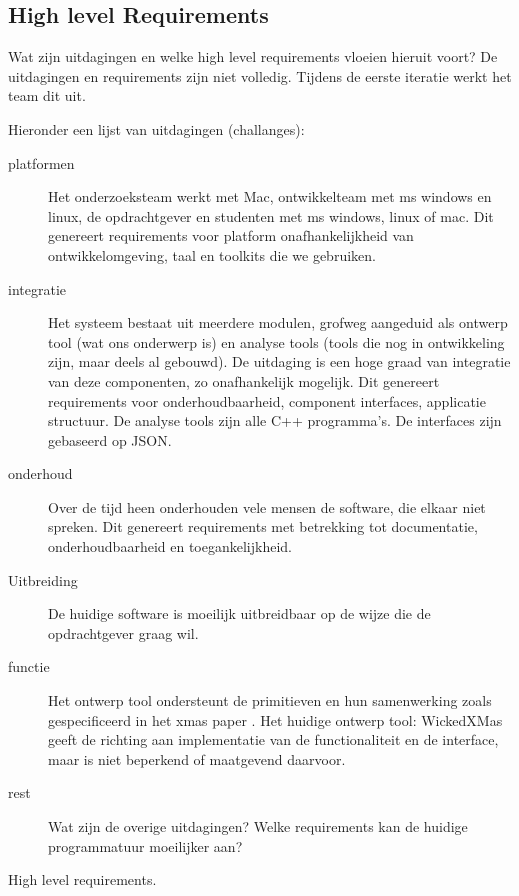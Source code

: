 \subsection{High level Requirements}

Wat zijn uitdagingen en welke high level requirements vloeien hieruit voort? De uitdagingen en requirements
zijn niet volledig. Tijdens de eerste iteratie werkt het team dit uit.

Hieronder een lijst van uitdagingen (challanges):

\begin{description}
 \item[platformen] Het onderzoeksteam werkt met Mac, ontwikkelteam met ms windows en linux, de opdrachtgever en studenten met ms windows, linux of mac.
		    Dit genereert requirements voor platform onafhankelijkheid van ontwikkelomgeving, taal en toolkits die we gebruiken.
 \item[integratie] Het systeem bestaat uit meerdere modulen, grofweg aangeduid als ontwerp tool (wat ons onderwerp is) en analyse tools (tools die nog
		    in ontwikkeling zijn, maar deels al gebouwd). De uitdaging is een hoge graad van integratie van deze componenten, zo onafhankelijk mogelijk.
		    Dit genereert requirements voor onderhoudbaarheid, component interfaces, applicatie structuur. De analyse tools zijn alle C++ programma's.
		    De interfaces zijn gebaseerd op JSON.
 \item[onderhoud] Over de tijd heen onderhouden vele mensen de software, die elkaar niet spreken. Dit genereert requirements met betrekking tot documentatie,
		    onderhoudbaarheid en toegankelijkheid.
 \item[Uitbreiding] De huidige software is moeilijk uitbreidbaar op de wijze die de opdrachtgever graag wil.
 \item[functie] Het ontwerp tool ondersteunt de primitieven en hun samenwerking zoals gespecificeerd in het xmas paper \cite{chatterjee-kishinevsky:xmas}.
		Het  huidige ontwerp tool: WickedXMas geeft de richting aan implementatie van de functionaliteit en de interface, maar is
		niet beperkend of maatgevend daarvoor.
 \item[rest]	Wat zijn de overige uitdagingen? Welke requirements kan de huidige programmatuur moeilijker aan?
\end{description}

High level requirements.

